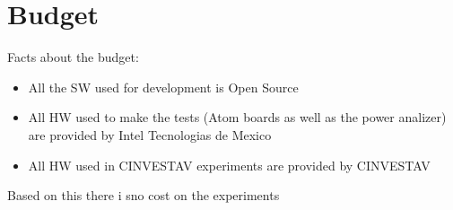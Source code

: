 \section{Budget}
\noindent

Facts about the budget:
\begin{itemize}
    \item All the SW used for development is Open Source
    \item All HW used to make the tests (Atom boards as well as the power
    analizer) are provided by Intel Tecnologias de Mexico
    \item All HW used in CINVESTAV experiments are provided by CINVESTAV
\end{itemize}

Based on this there i sno cost on the experiments

\clearpage
